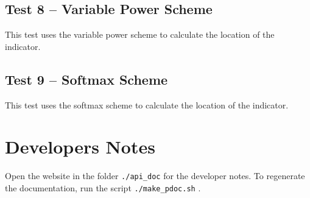 \documentclass{article}
\begin{document}
\subsection{Test 8 -- Variable Power Scheme}
This test uses the variable power scheme to calculate the location of the indicator.

\subsection{Test 9 -- Softmax Scheme}
This test uses the softmax scheme to calculate the location of the indicator.

\section{Developers Notes}
Open the website in the folder \texttt{./api\_doc} for the developer notes.
To regenerate the documentation, run the script \texttt{./make\_pdoc.sh} .


\end{document}
